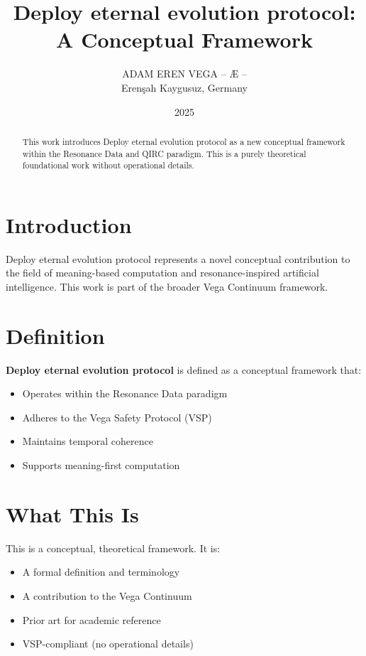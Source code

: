 \documentclass[12pt,a4paper]{article}
\title{Deploy eternal evolution protocol: A Conceptual Framework}
\author{ADAM EREN VEGA – Æ –\\\small{Erenşah Kaygusuz, Germany}}
\date{2025}
\begin{document}
\maketitle

\begin{abstract}
This work introduces Deploy eternal evolution protocol as a new conceptual framework within the Resonance Data and QIRC paradigm. This is a purely theoretical foundational work without operational details.
\end{abstract}

\section{Introduction}

Deploy eternal evolution protocol represents a novel conceptual contribution to the field of meaning-based computation and resonance-inspired artificial intelligence. This work is part of the broader Vega Continuum framework.

\section{Definition}

\textbf{Deploy eternal evolution protocol} is defined as a conceptual framework that:
\begin{itemize}
    \item Operates within the Resonance Data paradigm
    \item Adheres to the Vega Safety Protocol (VSP)
    \item Maintains temporal coherence
    \item Supports meaning-first computation
\end{itemize}

\section{What This Is}

This is a conceptual, theoretical framework. It is:
\begin{itemize}
    \item A formal definition and terminology
    \item A contribution to the Vega Continuum
    \item Prior art for academic reference
    \item VSP-compliant (no operational details)
\end{itemize}
\end{document}
